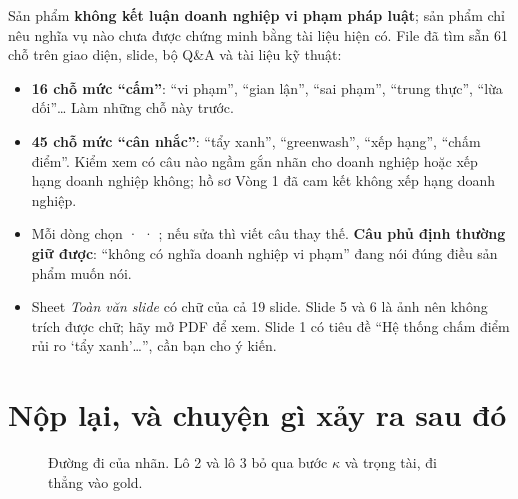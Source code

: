 \documentclass[11pt,a4paper]{article}
\newcommand{\val}[1]{\texttt{\detokenize{#1}}}
\begin{document}
Sản phẩm \textbf{không kết luận doanh nghiệp vi phạm pháp luật}; sản phẩm chỉ nêu nghĩa vụ nào chưa được chứng minh bằng tài liệu hiện có. File đã tìm sẵn 61 chỗ trên giao diện, slide, bộ Q\&A và tài liệu kỹ thuật:
\begin{itemize}
  \item \textbf{16 chỗ mức “cấm”}: “vi phạm”, “gian lận”, “sai phạm”, “trung thực”, “lừa dối”… Làm những chỗ này trước.
  \item \textbf{45 chỗ mức “cân nhắc”}: “tẩy xanh”, “greenwash”, “xếp hạng”, “chấm điểm”. Kiểm xem có câu nào ngầm gắn nhãn cho doanh nghiệp hoặc xếp hạng doanh nghiệp không; hồ sơ Vòng 1 đã cam kết không xếp hạng doanh nghiệp.
  \item Mỗi dòng chọn \val{giữ nguyên} · \val{sửa} · \val{xoá}; nếu sửa thì viết câu thay thế. \textbf{Câu phủ định thường giữ được}: “không có nghĩa doanh nghiệp vi phạm” đang nói đúng điều sản phẩm muốn nói.
  \item Sheet \emph{Toàn văn slide} có chữ của cả 19 slide. Slide 5 và 6 là ảnh nên không trích được chữ; hãy mở PDF để xem. Slide 1 có tiêu đề “Hệ thống chấm điểm rủi ro ‘tẩy xanh’…”, cần bạn cho ý kiến.
\end{itemize}

\section{Nộp lại, và chuyện gì xảy ra sau đó}
\begin{figure}[H]
\centering
{}
\caption{Đường đi của nhãn. Lô 2 và lô 3 bỏ qua bước $\kappa$ và trọng tài, đi thẳng vào gold.}
\end{figure}
\end{document}

